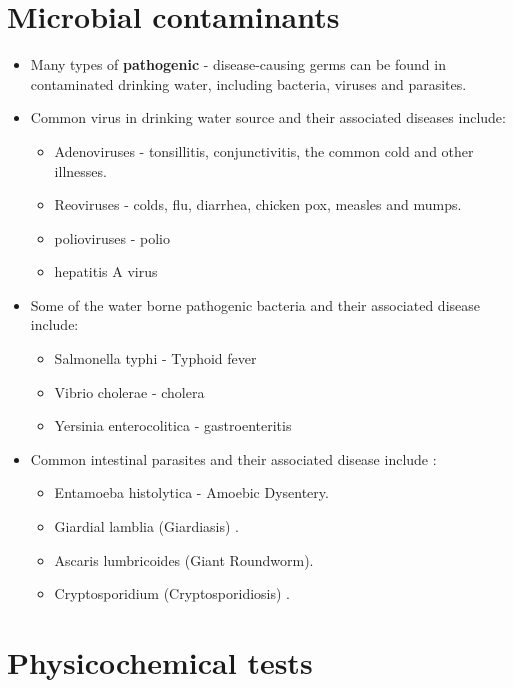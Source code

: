 \section{Microbial contaminants}
\begin{itemize}
\item Many types of \textbf{pathogenic} - disease-causing germs can be found in contaminated drinking water, including bacteria, viruses and parasites.

\item Common virus in drinking water  source and their associated diseases include:
\begin{itemize}
\item Adenoviruses - tonsillitis, conjunctivitis, the common cold and other illnesses. 
\item Reoviruses - colds, flu, diarrhea, chicken pox, measles and mumps.
\item polioviruses - polio
\item hepatitis A virus
\end{itemize}

\item Some of the water borne pathogenic bacteria  and their associated disease include:
\begin{itemize}
\item Salmonella typhi - Typhoid fever
\item Vibrio cholerae - cholera
\item Yersinia enterocolitica - gastroenteritis
\end{itemize}

\item Common intestinal parasites and their associated disease include :
\begin{itemize}
\item Entamoeba histolytica - Amoebic Dysentery.
\item Giardial lamblia (Giardiasis) .
\item Ascaris lumbricoides (Giant Roundworm).
\item Cryptosporidium (Cryptosporidiosis) .
\end{itemize}


\end{itemize}
 



\section{Physicochemical tests} 

